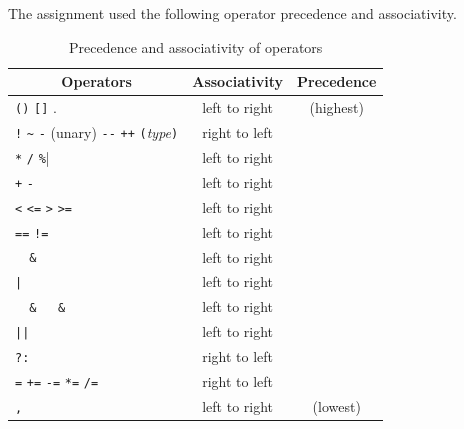 \documentclass{report}
\newcommand{\+}{}
\begin{document}
    The assignment used the following operator precedence and associativity.
    \begin{table}[t]
        \begin{center}
            \begin{tabular}{@{}l|c|c}
                \hline
                \multicolumn{1}{c|}{\sc Operators}
                &
                    {\sc Associativity}
                &
                    {\sc Precedence}
                \\ \hline
                \verb|()| \quad \verb|[]| \quad .
                &
                left to right
                &
                (highest)
                \\
                \verb|!| \quad \verb|~| \quad \verb|-| (unary)
                \quad \verb|--| \quad \verb|++|
                \quad \verb|(|\emph{type}\verb|)|
                &
                right to left
                \\
                \verb|*| \quad \verb|/| \quad \verb|%|
                &
                left to right
                \\
                \verb|+| \quad \verb|-|
                &
                left to right
                \\
                \verb|<| \quad \verb|<=| \quad \verb|>| \quad \verb|>=|
                &
                left to right
                \\
                \verb|==| \quad \verb|!=|
                &
                left to right
                \\
                \verb|  &  |
                &
                left to right
                \\
                \verb$|$
                &
                left to right
                \\
                \verb|  &   &  |
                &
                left to right
                \\
                \verb$||$
                &
                left to right
                \\
                \verb$?:$
                &
                right to left
                \\
                \verb|=| \quad \verb|+=| \quad \verb|-=| \quad \verb|*=| \quad \verb|/=|
                &
                right to left
                \\
                \verb|,|
                &
                left to right
                &
                (lowest)
                \\ \hline
            \end{tabular}
        \end{center}
        \caption{Precedence and associativity of operators}
        \label{TAB:precedence}
    \end{table}
\end{document}
